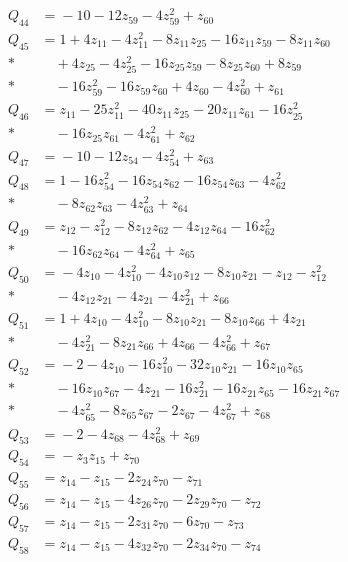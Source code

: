 \begin{align*}
Q_{44} &={}-10 - 12z_{59} - 4z_{59}^{2} + z_{60}\\[4pt]
Q_{45} &={}1 + 4z_{11} - 4z_{11}^{2} - 8z_{11}z_{25} - 16z_{11}z_{59} - 8z_{11}z_{60}\\*
&\quad{} + 4z_{25} - 4z_{25}^{2} - 16z_{25}z_{59} - 8z_{25}z_{60} + 8z_{59}\\*
&\quad{} - 16z_{59}^{2} - 16z_{59}z_{60} + 4z_{60} - 4z_{60}^{2} + z_{61}\\[4pt]
Q_{46} &={}z_{11} - 25z_{11}^{2} - 40z_{11}z_{25} - 20z_{11}z_{61} - 16z_{25}^{2}\\*
&\quad{} - 16z_{25}z_{61} - 4z_{61}^{2} + z_{62}\\[4pt]
Q_{47} &={}-10 - 12z_{54} - 4z_{54}^{2} + z_{63}\\[4pt]
Q_{48} &={}1 - 16z_{54}^{2} - 16z_{54}z_{62} - 16z_{54}z_{63} - 4z_{62}^{2}\\*
&\quad{} - 8z_{62}z_{63} - 4z_{63}^{2} + z_{64}\\[4pt]
Q_{49} &={}z_{12} - z_{12}^{2} - 8z_{12}z_{62} - 4z_{12}z_{64} - 16z_{62}^{2}\\*
&\quad{} - 16z_{62}z_{64} - 4z_{64}^{2} + z_{65}\\[4pt]
Q_{50} &={}-4z_{10} - 4z_{10}^{2} - 4z_{10}z_{12} - 8z_{10}z_{21} - z_{12} - z_{12}^{2}\\*
&\quad{} - 4z_{12}z_{21} - 4z_{21} - 4z_{21}^{2} + z_{66}\\[4pt]
Q_{51} &={}1 + 4z_{10} - 4z_{10}^{2} - 8z_{10}z_{21} - 8z_{10}z_{66} + 4z_{21}\\*
&\quad{} - 4z_{21}^{2} - 8z_{21}z_{66} + 4z_{66} - 4z_{66}^{2} + z_{67}\\[4pt]
Q_{52} &={}-2 - 4z_{10} - 16z_{10}^{2} - 32z_{10}z_{21} - 16z_{10}z_{65}\\*
&\quad{} - 16z_{10}z_{67} - 4z_{21} - 16z_{21}^{2} - 16z_{21}z_{65} - 16z_{21}z_{67}\\*
&\quad{} - 4z_{65}^{2} - 8z_{65}z_{67} - 2z_{67} - 4z_{67}^{2} + z_{68}\\[4pt]
Q_{53} &={}-2 - 4z_{68} - 4z_{68}^{2} + z_{69}\\[4pt]
Q_{54} &={}-z_{3}z_{15} + z_{70}\\[4pt]
Q_{55} &={}z_{14} - z_{15} - 2z_{24}z_{70} - z_{71}\\[4pt]
Q_{56} &={}z_{14} - z_{15} - 4z_{26}z_{70} - 2z_{29}z_{70} - z_{72}\\[4pt]
Q_{57} &={}z_{14} - z_{15} - 2z_{31}z_{70} - 6z_{70} - z_{73}\\[4pt]
Q_{58} &={}z_{14} - z_{15} - 4z_{32}z_{70} - 2z_{34}z_{70} - z_{74}\\[4pt]

\end{align*}
